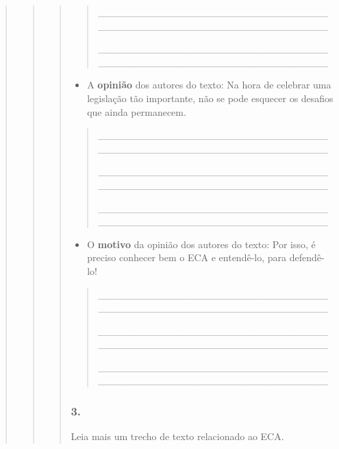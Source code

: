 \begin{quote}
\begin{quote}
\begin{quote}
\begin{quote}
\_\_\_\_\_\_\_\_\_\_\_\_\_\_\_\_\_\_\_\_\_\_\_\_\_\_\_\_\_\_\_\_\_\_\_\_\_\_\_\_\_\_\_\_\_\_\_\_\_\_\_\_\_\_\_\_\_\_\_\_\_\_\_\_

\_\_\_\_\_\_\_\_\_\_\_\_\_\_\_\_\_\_\_\_\_\_\_\_\_\_\_\_\_\_\_\_\_\_\_\_\_\_\_\_\_\_\_\_\_\_\_\_\_\_\_\_\_\_\_\_\_\_\_\_\_\_\_\_
\end{quote}

\begin{itemize}
\item
  A \textbf{opinião} dos autores do texto: Na hora de celebrar uma
  legislação tão importante, não se pode esquecer os desafios que ainda
  permanecem.
\end{itemize}

\begin{quote}
\_\_\_\_\_\_\_\_\_\_\_\_\_\_\_\_\_\_\_\_\_\_\_\_\_\_\_\_\_\_\_\_\_\_\_\_\_\_\_\_\_\_\_\_\_\_\_\_\_\_\_\_\_\_\_\_\_\_\_\_\_\_\_\_

\_\_\_\_\_\_\_\_\_\_\_\_\_\_\_\_\_\_\_\_\_\_\_\_\_\_\_\_\_\_\_\_\_\_\_\_\_\_\_\_\_\_\_\_\_\_\_\_\_\_\_\_\_\_\_\_\_\_\_\_\_\_\_\_

\_\_\_\_\_\_\_\_\_\_\_\_\_\_\_\_\_\_\_\_\_\_\_\_\_\_\_\_\_\_\_\_\_\_\_\_\_\_\_\_\_\_\_\_\_\_\_\_\_\_\_\_\_\_\_\_\_\_\_\_\_\_\_\_
\end{quote}

\begin{itemize}
\item
  O \textbf{motivo} da opinião dos autores do texto: Por isso, é preciso
  conhecer bem o ECA e entendê-lo, para defendê-lo!
\end{itemize}

\begin{quote}
\_\_\_\_\_\_\_\_\_\_\_\_\_\_\_\_\_\_\_\_\_\_\_\_\_\_\_\_\_\_\_\_\_\_\_\_\_\_\_\_\_\_\_\_\_\_\_\_\_\_\_\_\_\_\_\_\_\_\_\_\_\_\_\_

\_\_\_\_\_\_\_\_\_\_\_\_\_\_\_\_\_\_\_\_\_\_\_\_\_\_\_\_\_\_\_\_\_\_\_\_\_\_\_\_\_\_\_\_\_\_\_\_\_\_\_\_\_\_\_\_\_\_\_\_\_\_\_\_

\_\_\_\_\_\_\_\_\_\_\_\_\_\_\_\_\_\_\_\_\_\_\_\_\_\_\_\_\_\_\_\_\_\_\_\_\_\_\_\_\_\_\_\_\_\_\_\_\_\_\_\_\_\_\_\_\_\_\_\_\_\_\_\_
\end{quote}

\subsubsection{3. }\label{section-62}

Leia mais um trecho de texto relacionado ao ECA.


\end{quote}
\end{quote}
\end{quote}
